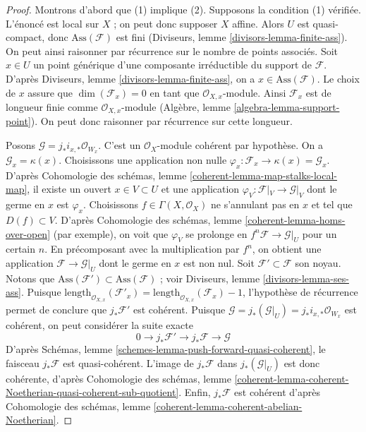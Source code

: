 \begin{proof}
Montrons d'abord que (1) implique (2). Supposons la condition (1) vérifiée. L'énoncé est local sur $X$ ; on peut donc supposer $X$ affine. Alors $U$ est quasi-compact, donc $\text{Ass}(\mathcal{F})$ est fini (Diviseurs, lemme \ref{divisors-lemma-finite-ass}). On peut ainsi raisonner par récurrence sur le nombre de points associés. Soit $x \in U$ un point générique d'une composante irréductible du support de $\mathcal{F}$. D'après Diviseurs, lemme \ref{divisors-lemma-finite-ass}, on a $x \in \text{Ass}(\mathcal{F})$. Le choix de $x$ assure que $\dim(\mathcal{F}_x) = 0$ en tant que $\mathcal{O}_{X, x}$-module. Ainsi $\mathcal{F}_x$ est de longueur finie comme $\mathcal{O}_{X, x}$-module (Algèbre, lemme \ref{algebra-lemma-support-point}). On peut donc raisonner par récurrence sur cette longueur.

\medskip\noindent
Posons $\mathcal{G} = j_*i_{x, *}\mathcal{O}_{W_x}$. C'est un $\mathcal{O}_X$-module cohérent par hypothèse. On a $\mathcal{G}_x = \kappa(x)$. Choisissons une application non nulle $\varphi_x : \mathcal{F}_x \to \kappa(x) = \mathcal{G}_x$. D'après Cohomologie des schémas, lemme \ref{coherent-lemma-map-stalks-local-map}, il existe un ouvert $x \in V \subset U$ et une application $\varphi_V : \mathcal{F}|_V \to \mathcal{G}|_V$ dont le germe en $x$ est $\varphi_x$. Choisissons $f \in \Gamma(X, \mathcal{O}_X)$ ne s'annulant pas en $x$ et tel que $D(f) \subset V$. D'après Cohomologie des schémas, lemme \ref{coherent-lemma-homs-over-open} (par exemple), on voit que $\varphi_V$ se prolonge en $f^n\mathcal{F} \to \mathcal{G}|_U$ pour un certain $n$. En précomposant avec la multiplication par $f^n$, on obtient une application $\mathcal{F} \to \mathcal{G}|_U$ dont le germe en $x$ est non nul. Soit $\mathcal{F}' \subset \mathcal{F}$ son noyau. Notons que $\text{Ass}(\mathcal{F}') \subset \text{Ass}(\mathcal{F})$ ; voir Diviseurs, lemme \ref{divisors-lemma-ses-ass}. Puisque $\text{length}_{\mathcal{O}_{X, x}}(\mathcal{F}'_x) =
\text{length}_{\mathcal{O}_{X, x}}(\mathcal{F}_x) - 1$, l'hypothèse de récurrence permet de conclure que $j_*\mathcal{F}'$ est cohérent. Puisque $\mathcal{G} = j_*(\mathcal{G}|_U) = j_*i_{x, *}\mathcal{O}_{W_x}$ est cohérent, on peut considérer la suite exacte
$$
0 \to j_*\mathcal{F}' \to j_*\mathcal{F} \to \mathcal{G}
$$
D'après Schémas, lemme \ref{schemes-lemma-push-forward-quasi-coherent}, le faisceau $j_*\mathcal{F}$ est quasi-cohérent. L'image de $j_*\mathcal{F}$ dans $j_*(\mathcal{G}|_U)$ est donc cohérente, d'après Cohomologie des schémas, lemme \ref{coherent-lemma-coherent-Noetherian-quasi-coherent-sub-quotient}. Enfin, $j_*\mathcal{F}$ est cohérent d'après Cohomologie des schémas, lemme \ref{coherent-lemma-coherent-abelian-Noetherian}.


\end{proof}
